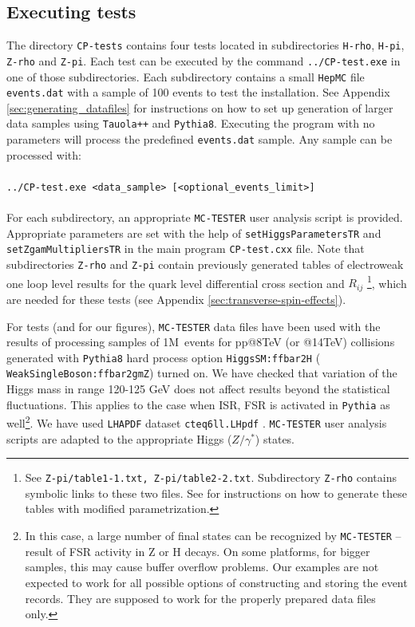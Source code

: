 \documentclass[12pt]{article}
\begin{document}
\subsection{Executing tests}
\label{sec:thetest}
The directory {\tt CP-tests} contains four tests located in subdirectories
{\tt H-rho}, {\tt H-pi}, {\tt Z-rho} and {\tt Z-pi}. Each test
can be executed by the command {\tt ../CP-test.exe} in one of those subdirectories.
Each subdirectory contains a small {\tt HepMC} file {\tt events.dat} with a sample of
100 events to test the installation. 
See Appendix \ref{sec:generating_datafiles} for instructions on how to set up generation
of larger data samples using {\tt Tauola++} and {\tt Pythia8}.
Executing the program with no parameters 
will process the predefined {\tt events.dat} sample.
Any   sample can be processed with: \\
\\
{\tt ../CP-test.exe <data\_sample> [<optional\_events\_limit>]} \\
\\
For each  subdirectory, an appropriate {\tt MC-TESTER}
user analysis script is provided. Appropriate parameters are set with the help of  
{\tt setHiggsParametersTR} and {\tt setZgamMultipliersTR}
 in the main program {\tt CP-test.cxx} file.
Note that subdirectories {\tt Z-rho} and {\tt Z-pi} contain previously generated  tables of electroweak one loop level 
results for the quark level differential cross section and $R_{ij}$%
\footnote{ See {\tt Z-pi/table1-1.txt, Z-pi/table2-2.txt}. Subdirectory {\tt Z-rho} contains
symbolic links to these two files. See \cite{Davidson:2010rw} for instructions on how to
generate these tables with modified parametrization.},
which are needed for these tests (see Appendix \ref{sec:transverse-spin-effects}).

For  tests (and for our figures), {\tt MC-TESTER} data files have been used with the results
of processing samples of 1M~events for pp@8TeV (or @14TeV) collisions generated with {\tt Pythia8} \cite{Sjostrand:2007gs}
hard process option {\tt HiggsSM:ffbar2H} ( {\tt WeakSingleBoson:ffbar2gmZ}) turned on.
We have checked that  variation of the Higgs mass in range 120-125 GeV does not affect results beyond the statistical fluctuations.
This applies to the case when ISR, FSR is activated in {\tt Pythia}
as well\footnote{ In this case, a large number  of final states can be recognized by {\tt MC-TESTER} -- result of FSR activity in Z or H decays.
On some platforms, for bigger samples, this may cause buffer overflow problems.
Our examples are not expected to work for all 
possible options of constructing and storing the event records.
They are supposed to work for the
properly prepared data files only.}.
We have used {\tt LHAPDF} dataset {\tt cteq6ll.LHpdf} \cite{LHAPDF-pdfsets}.
{\tt MC-TESTER} user analysis scripts are adapted to the appropriate Higgs ($Z/\gamma^*$) states.
\end{document}
